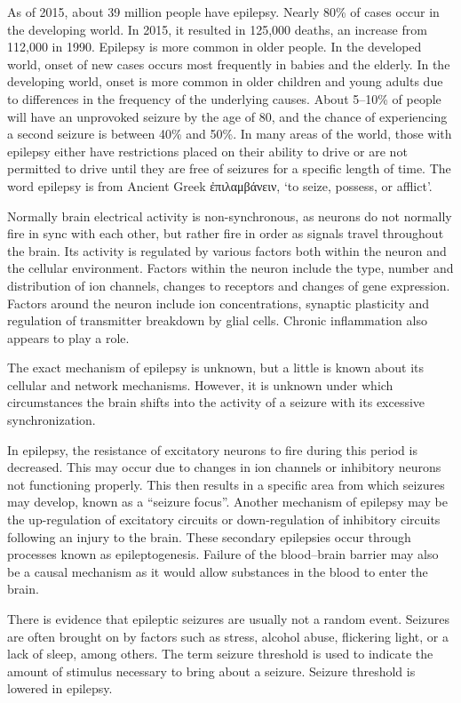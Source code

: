 As of 2015, about 39 million people have epilepsy. Nearly 80\% of cases
occur in the developing world. In 2015, it resulted in 125,000 deaths,
an increase from 112,000 in 1990. Epilepsy is more common in older
people. In the developed world, onset of new cases occurs most
frequently in babies and the elderly. In the developing world, onset is
more common in older children and young adults due to differences in the
frequency of the underlying causes. About 5--10\% of people will have an
unprovoked seizure by the age of 80, and the chance of experiencing a
second seizure is between 40\% and 50\%. In many areas of the world,
those with epilepsy either have restrictions placed on their ability to
drive or are not permitted to drive until they are free of seizures for
a specific length of time. The word epilepsy is from Ancient Greek
ἐπιλαμβάνειν, `to seize, possess, or afflict'.

Normally brain electrical activity is non-synchronous, as neurons do not
normally fire in sync with each other, but rather fire in order as
signals travel throughout the brain. Its activity is regulated by
various factors both within the neuron and the cellular environment.
Factors within the neuron include the type, number and distribution of
ion channels, changes to receptors and changes of gene expression.
Factors around the neuron include ion concentrations, synaptic
plasticity and regulation of transmitter breakdown by glial cells.
Chronic inflammation also appears to play a role.

The exact mechanism of epilepsy is unknown, but a little is known about
its cellular and network mechanisms. However, it is unknown under which
circumstances the brain shifts into the activity of a seizure with its
excessive synchronization.

In epilepsy, the resistance of excitatory neurons to fire during this
period is decreased. This may occur due to changes in ion channels or
inhibitory neurons not functioning properly. This then results in a
specific area from which seizures may develop, known as a ``seizure
focus''. Another mechanism of epilepsy may be the up-regulation of
excitatory circuits or down-regulation of inhibitory circuits following
an injury to the brain. These secondary epilepsies occur through
processes known as epileptogenesis. Failure of the blood--brain barrier
may also be a causal mechanism as it would allow substances in the blood
to enter the brain.

There is evidence that epileptic seizures are usually not a random
event. Seizures are often brought on by factors such as stress, alcohol
abuse, flickering light, or a lack of sleep, among others. The term
seizure threshold is used to indicate the amount of stimulus necessary
to bring about a seizure. Seizure threshold is lowered in epilepsy.

